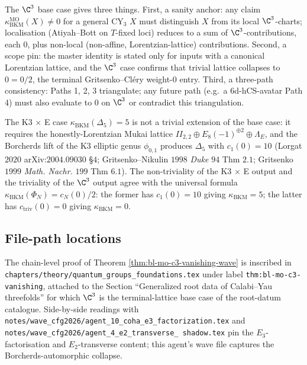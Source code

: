 The $\C^3$ base case gives three things. First, a sanity anchor:
any claim $\kappa_{\mathrm{BKM}}^{\mathrm{MO}}(X) \ne 0$ for a
general CY$_3$ $X$ must distinguish $X$ from its local
$\C^3$-charts; localisation (Atiyah--Bott on $T$-fixed loci)
reduces to a sum of $\C^3$-contributions, each $0$, plus
non-local (non-affine, Lorentzian-lattice) contributions.
Second, a scope pin: the master identity is stated only for
inputs with a canonical Lorentzian lattice, and the $\C^3$ case
confirms that trivial lattice collapses to $0 = 0/2$, the
terminal Gritsenko--Cl\'ery weight-$0$ entry. Third, a
three-path consistency: Paths 1, 2, 3 triangulate; any future
path (e.g.\ a $6$d-hCS-avatar Path 4) must also evaluate to $0$
on $\C^3$ or contradict this triangulation.

The K3 $\times$ E case $\kappa_{\mathrm{BKM}}(\Delta_5) = 5$
is not a trivial extension of the base case: it requires the
honestly-Lorentzian Mukai lattice
$II_{2, 2} \oplus E_8(-1)^{\oplus 2} \oplus \Lambda_E$, and the
Borcherds lift of the K3 elliptic genus $\phi_{0, 1}$ produces
$\Delta_5$ with $c_1(0) = 10$ (Lorgat $2020$ arXiv:$2004.09030$
\S $4$; Gritsenko--Nikulin $1998$ \textit{Duke} $94$ Thm $2.1$;
Gritsenko $1999$ \textit{Math. Nachr.} $199$ Thm $6.1$). The
non-triviality of the K3 $\times$ E output and the triviality of
the $\C^3$ output agree with the universal formula
$\kappa_{\mathrm{BKM}}(\Phi_N) = c_N(0)/2$: the former has
$c_1(0) = 10$ giving $\kappa_{\mathrm{BKM}} = 5$; the latter has
$c_{\mathrm{triv}}(0) = 0$ giving $\kappa_{\mathrm{BKM}} = 0$.

\subsection*{File-path locations}

The chain-level proof of Theorem \ref{thm:bl-mo-c3-vanishing-wave}
is inscribed in
\texttt{chapters/theory/quantum\_groups\_foundations.tex}
under label \texttt{thm:bl-mo-c3-vanishing}, attached to the
Section ``Generalized root data of Calabi--Yau threefolds''
for which $\C^3$ is the terminal-lattice base case of the
root-datum catalogue. Side-by-side readings with
\texttt{notes/wave\_cfg2026/agent\_10\_coha\_e3\_factorization.tex}
and \texttt{notes/wave\_cfg2026/agent\_4\_e2\_transverse\_
shadow.tex} pin the $E_3$-factorisation and $E_2$-transverse
content; this agent's wave file captures the Borcherds-automorphic
collapse.
